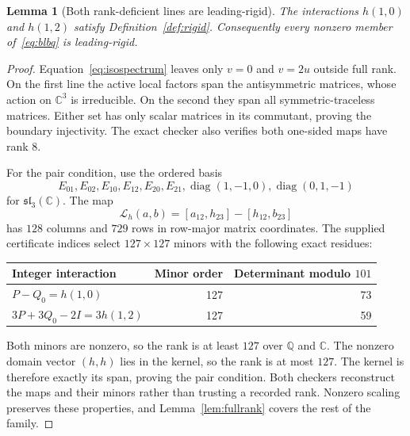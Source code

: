 \documentclass[11pt,a4paper]{article}
\numberwithin{equation}{section}
\newtheorem{lemma}[theorem]{Lemma}
\theoremstyle{definition}\newtheorem{definition}[theorem]{Definition}
\theoremstyle{remark}\newtheorem{remark}[theorem]{Remark}
\DeclareMathOperator{\diag}{diag}\DeclareMathOperator{\Disc}{Disc}
\newcommand{\Q}{\mathbb Q}\newcommand{\C}{\mathbb C}\newcommand{\R}{\mathbb R}
\begin{document}
\begin{lemma}[Both rank-deficient lines are leading-rigid]\label{lem:rankdef}
The interactions $h(1,0)$ and $h(1,2)$ satisfy Definition~\ref{def:rigid}. Consequently every nonzero member of~\eqref{eq:blbq} is leading-rigid.
\end{lemma}
\begin{proof}
Equation~\eqref{eq:isospectrum} leaves only $v=0$ and $v=2u$ outside full rank. On the first line the active local factors span the antisymmetric matrices, whose action on $\C^3$ is irreducible. On the second they span all symmetric-traceless matrices. Either set has only scalar matrices in its commutant, proving the boundary injectivity. The exact checker also verifies both one-sided maps have rank $8$.

For the pair condition, use the ordered basis
\begin{equation}\label{eq:realbasis}
 E_{01},E_{02},E_{10},E_{12},E_{20},E_{21},
 \diag(1,-1,0),\diag(0,1,-1)
\end{equation}
for $\mathfrak{sl}_3(\C)$. The map
\[
 \mathcal L_h(a,b)=[a_{12},h_{23}]-[h_{12},b_{23}]
\]
has $128$ columns and $729$ rows in row-major matrix coordinates. The supplied certificate indices select $127\times127$ minors with the following exact residues:
\begin{center}
\begin{tabular}{lrr}
\toprule
Integer interaction & Minor order & Determinant modulo $101$\\
\midrule
$P-Q_0=h(1,0)$ &127&73\\
$3P+3Q_0-2I=3h(1,2)$ &127&59\\
\bottomrule
\end{tabular}
\end{center}
Both minors are nonzero, so the rank is at least $127$ over $\Q$ and $\C$. The nonzero domain vector $(h,h)$ lies in the kernel, so the rank is at most $127$. The kernel is therefore exactly its span, proving the pair condition. Both checkers reconstruct the maps and their minors rather than trusting a recorded rank. Nonzero scaling preserves these properties, and Lemma~\ref{lem:fullrank} covers the rest of the family.
\end{proof}
\end{document}
